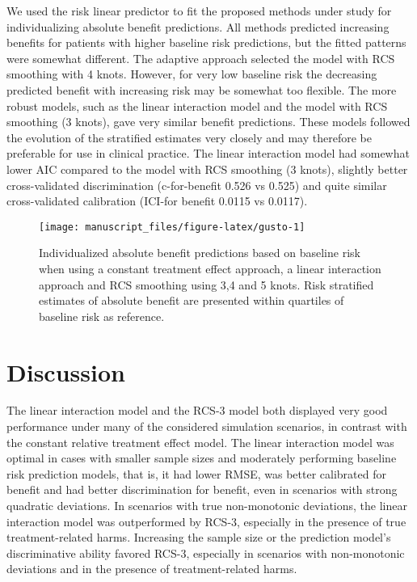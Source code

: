 \documentclass[]{elsarticle} %
\begin{document}
We used the risk linear predictor to fit the proposed methods under
study for individualizing absolute benefit predictions. All methods
predicted increasing benefits for patients with higher baseline risk
predictions, but the fitted patterns were somewhat different. The
adaptive approach selected the model with RCS smoothing with 4 knots.
However, for very low baseline risk the decreasing predicted benefit
with increasing risk may be somewhat too flexible. The more robust
models, such as the linear interaction model and the model with RCS
smoothing (3 knots), gave very similar benefit predictions. These models
followed the evolution of the stratified estimates very closely and may
therefore be preferable for use in clinical practice. The linear
interaction model had somewhat lower AIC compared to the model with RCS
smoothing (3 knots), slightly better cross-validated discrimination
(c-for-benefit 0.526 vs 0.525) and quite similar cross-validated
calibration (ICI-for benefit 0.0115 vs 0.0117).

\begin{figure}
\texttt{[image: manuscript\_files/figure-latex/gusto-1]} \caption{Individualized absolute benefit predictions based on baseline risk when using a constant treatment effect approach, a linear interaction approach and RCS smoothing using 3,4 and 5 knots. Risk stratified estimates of absolute benefit are presented within quartiles of baseline risk as reference.}\label{fig:gusto}
\end{figure}

\hypertarget{discussion}{%
\section{Discussion}\label{discussion}}

The linear interaction model and the RCS-3 model both displayed very
good performance under many of the considered simulation scenarios, in
contrast with the constant relative treatment effect model. The linear
interaction model was optimal in cases with smaller sample sizes and
moderately performing baseline risk prediction models, that is, it had
lower RMSE, was better calibrated for benefit and had better
discrimination for benefit, even in scenarios with strong quadratic
deviations. In scenarios with true non-monotonic deviations, the linear
interaction model was outperformed by RCS-3, especially in the presence
of true treatment-related harms. Increasing the sample size or the
prediction model's discriminative ability favored RCS-3, especially in
scenarios with non-monotonic deviations and in the presence of
treatment-related harms.
\end{document}
